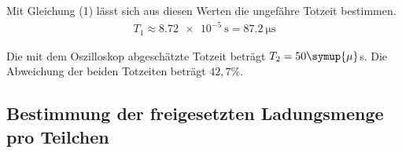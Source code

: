 Mit Gleichung (1) lässt sich aus diesen Werten die ungefähre Totzeit bestimmen.
\begin{align*}
  T_1 \approx \SI{8.72e-5}{\second} = \SI{87,2}{\micro\second}
\end{align*}

Die mit dem Oszilloskop abgeschätzte Totzeit beträgt $T_2 = 50 \symup{\mu}$s.
Die Abweichung der beiden Totzeiten beträgt $42,7 \%$.


\subsection{Bestimmung der freigesetzten Ladungsmenge pro Teilchen}
